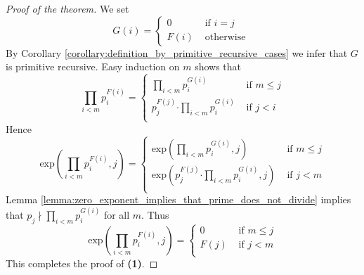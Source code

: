 \documentclass[10pt]{amsart}
\newcommand{\mle}{\boldsymbol{<}}
\newcommand{\mleq}{\boldsymbol{\leq}}
\newcommand{\meq}{\boldsymbol{=}}
\newcommand{\mdot}{\boldsymbol{\cdot}}
\begin{document}
\begin{proof}[Proof of the theorem]
	We set
	$$G(i) \meq \begin{cases}
			0    & \mbox{ if }i \meq j   \\
			F(i) & \mbox{ otherwise }
		\end{cases}$$
	By Corollary \ref{corollary:definition_by_primitive_recursive_cases} we infer that $G$ is primitive recursive. Easy induction on $m$ shows that
	$$
		\prod_{i \mle m} p_i^{F(i)} =
		\begin{cases}
			\prod_{i \mle m} p_i^{G(i)}                  & \mbox{ if } m \mleq j \\[0.3em]
			p_j^{F(j)} \mdot \prod_{i \mle m} p_i^{G(i)} & \mbox{ if } j \mle i    \\
		\end{cases}
	$$
	Hence
	$$\mathrm{exp}\left(\prod_{i \mle m}p_i^{F(i)},j\right) \meq \begin{cases}
			\mathrm{exp}\left(\prod_{i \mle m}p_i^{G(i)}, j\right)                 & \mbox{ if }m \mleq j \\[0.3em]
			\mathrm{exp}\left(p_j^{F(j)}\mdot \prod_{i \mle m}p_i^{G(i)}, j\right) & \mbox{ if }j \mle m    \\
		\end{cases}
	$$
	Lemma \ref{lemma:zero_exponent_implies_that_prime_does_not_divide} implies that $p_j \nmid \prod_{i \mle m}p_i^{G(i)}$ for all $m$. Thus
	$$\mathrm{exp}\left(\prod_{i \mle m}p_i^{F(i)},j\right) \meq \begin{cases}
			0    & \mbox{ if }m \mleq j \\[0.3em]
			F(j) & \mbox{ if }j \mle m    \\
		\end{cases}
	$$
	This completes the proof of \textbf{(1)}.


\end{proof}
\end{document}
